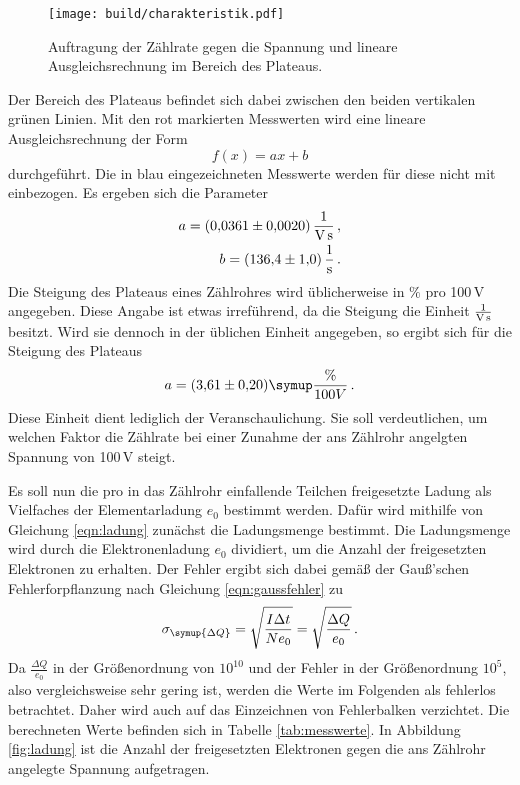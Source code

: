 \begin{figure}
  \centering
  \texttt{[image: build/charakteristik.pdf]}
  \caption{Auftragung der Zählrate gegen die Spannung und lineare Ausgleichsrechnung
  im Bereich des Plateaus.}
  \label{fig:plateau}
\end{figure}

Der Bereich des Plateaus befindet sich dabei zwischen den
beiden vertikalen grünen Linien. Mit den rot markierten Messwerten wird eine lineare
Ausgleichsrechnung der Form
\begin{equation}
  f(x)=ax+b
\end{equation}
durchgeführt. Die in blau eingezeichneten Messwerte werden für diese nicht mit
einbezogen. Es ergeben sich die Parameter
\begin{align*}
  a = (0{,}0361 \pm 0{,}0020)\, \frac{1}{\text{V\,s}} \,,\\
  b = (136{,}4 \pm 1{,}0)\,\frac{1}{\text{s}} \,.
\end{align*}
Die Steigung des Plateaus eines Zählrohres wird üblicherweise in $\%$ pro 100\,V
angegeben. Diese Angabe ist etwas irreführend, da die Steigung die Einheit
$\frac{1}{\text{V\,s}}$ besitzt. Wird sie dennoch in der üblichen Einheit angegeben,
so ergibt sich für die Steigung des Plateaus
\begin{equation*}
  a=(3{,}61 \pm 0{,}20) \symup{\frac{\%}{100V}} \,.  %
\end{equation*}
Diese Einheit dient lediglich der Veranschaulichung. Sie soll verdeutlichen, um welchen
Faktor die Zählrate bei einer Zunahme der ans Zählrohr angelgten Spannung von 100\,V
steigt.





Es soll nun die pro in das Zählrohr einfallende Teilchen freigesetzte Ladung
als Vielfaches der Elementarladung $e_0$ bestimmt werden. Dafür wird mithilfe von
Gleichung \eqref{eqn:ladung} zunächst die Ladungsmenge bestimmt. Die Ladungsmenge wird durch die
Elektronenladung $e_0$ dividiert, um die Anzahl der freigesetzten Elektronen
zu erhalten. Der Fehler ergibt sich dabei
gemäß der Gauß'schen Fehlerforpflanzung nach Gleichung \eqref{eqn:gaussfehler} zu
\begin{equation*}
  \sigma_{\symup{\Delta Q}}=\sqrt{\frac{I \Delta t}{N e_0}}=\sqrt{\frac{\Delta Q}{e_0}} \,.
\end{equation*}
Da $\frac{\Delta Q}{e_0}$ in der Größenordnung von $10^{10}$ und der Fehler in der
Größenordnung $10^{5}$, also vergleichsweise sehr gering ist, werden die
Werte im Folgenden als fehlerlos betrachtet. Daher wird auch auf das Einzeichnen von
Fehlerbalken verzichtet. Die berechneten Werte
befinden sich in Tabelle \ref{tab:messwerte}.
In Abbildung \ref{fig:ladung} ist die Anzahl der freigesetzten Elektronen
gegen die ans Zählrohr angelegte Spannung aufgetragen.

